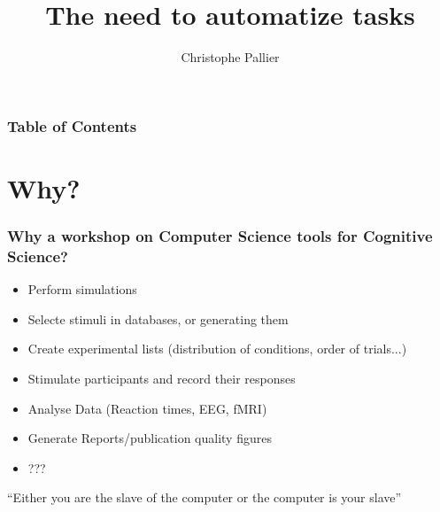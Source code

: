 \documentclass{beamer}
\title[Tips and Tricks]
{The need to automatize tasks}
\subtitle{}
\author[Christophe Pallier] %
{Christophe Pallier}
\institute
{
  CNRS\\
  Unit\'e INSERM-CEA de Neuroimagerie Cognitive\\
  Gif-sur-Yvette
}
\date[17 Juin 2013] %
\newcounter{saveenumi}
\newcommand{\seti}{\setcounter{saveenumi}{\value{enumi}}}
\newcommand{\conti}{\setcounter{enumi}{\value{saveenumi}}}
\begin{document}
\frame{\titlepage}

\begin{frame}
\frametitle{Table of Contents}
\tableofcontents[currentsection]


\end{frame}




\section{Why?}

\begin{frame}
\frametitle{Why a workshop on Computer Science tools for Cognitive Science?}

\begin{itemize}
\item Perform simulations
\pause

\item Selecte stimuli in databases, or generating them
\pause

\item Create experimental lists (distribution of conditions, order of trials...)
\pause

\item Stimulate participants and record their responses
\pause

\item Analyse Data (Reaction times, EEG, fMRI)
\pause

\item Generate Reports/publication quality figures
\pause

\item ??? 
\end{itemize}

\pause

\begin{centering}
``Either you are the slave of the computer or the computer is your slave''
\end{centering}
\end{frame}
\end{document}
